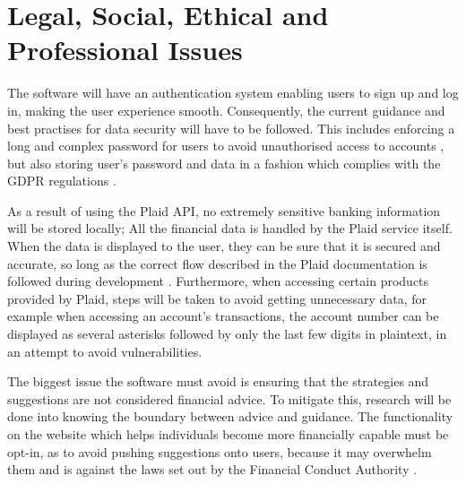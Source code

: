 \section{Legal, Social, Ethical and Professional Issues}
The software will have an authentication system enabling users to sign up and log in, making the user experience smooth. Consequently, the current guidance and best practises for data security will have to be followed. This includes enforcing a long and complex password for users to avoid unauthorised access to accounts \cite{PasswordRequirements}, but also storing user's password and data in a fashion which complies with the GDPR regulations \cite{GDPR}.

As a result of using the Plaid API, no extremely sensitive banking information will be stored locally; All the financial data is handled by the Plaid service itself. When the data is displayed to the user, they can be sure that it is secured and accurate, so long as the correct flow described in the Plaid documentation is followed during development \cite{PlaidGettingStarted}. Furthermore, when accessing certain products provided by Plaid, steps will be taken to avoid getting unnecessary data, for example when accessing an account's transactions, the account number can be displayed as several asterisks followed by only the last few digits in plaintext, in an attempt to avoid vulnerabilities.

The biggest issue the software must avoid is ensuring that the strategies and suggestions are not considered financial advice. To mitigate this, research will be done into knowing the boundary between advice and guidance. The functionality on the website which helps individuals become more financially capable must be opt-in, as to avoid pushing suggestions onto users, because it may overwhelm them and is against the laws set out by the Financial Conduct Authority \cite{AdviceVsGuidance}.